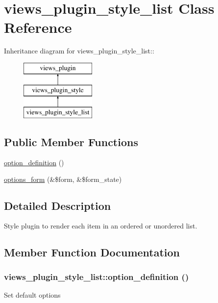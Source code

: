 \hypertarget{classviews__plugin__style__list}{
\section{views\_\-plugin\_\-style\_\-list Class Reference}
\label{classviews__plugin__style__list}
}
Inheritance diagram for views\_\-plugin\_\-style\_\-list::\begin{figure}[H]
\begin{center}
\leavevmode
\includegraphics[height=3cm]{classviews__plugin__style__list}
\end{center}
\end{figure}
\subsection*{Public Member Functions}
\begin{DoxyCompactItemize}
\item 
\hyperlink{classviews__plugin__style__list_aa95419c3a9f3a6db10f6c6858e5c5bd1}{option\_\-definition} ()
\item 
\hyperlink{classviews__plugin__style__list_a37ec2449bb2119e4a8c3730cd458ecdb}{options\_\-form} (\&\$form, \&\$form\_\-state)
\end{DoxyCompactItemize}


\subsection{Detailed Description}
Style plugin to render each item in an ordered or unordered list. 

\subsection{Member Function Documentation}
\hypertarget{classviews__plugin__style__list_aa95419c3a9f3a6db10f6c6858e5c5bd1}{
\subsubsection[{option\_\-definition}]{\setlength{\rightskip}{0pt plus 5cm}views\_\-plugin\_\-style\_\-list::option\_\-definition ()}}
\label{classviews__plugin__style__list_aa95419c3a9f3a6db10f6c6858e5c5bd1}
Set default options 

